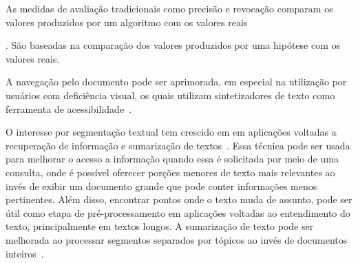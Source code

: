 As medidas de avaliação tradicionais como precisão e revocação comparam os valores produzidos por um algoritmo com os valores reais 



. São baseadas na comparação dos valores produzidos por uma hipótese com os valores reais. 












A navegação pelo documento pode ser aprimorada, em especial na utilização por usuários com deficiência visual, os quais utilizam  sintetizadores de texto como ferramenta de acessibilidade~\cite{Choi2000}. 








O interesse por segmentação textual tem crescido em em aplicações voltadas a recuperação de informação %
e sumarização de textos~\cite{Maziero2016}. %
Essa técnica pode ser usada para melhorar o acesso a informação quando essa é solicitada por meio de uma consulta, onde é possível oferecer porções menores de texto mais relevantes ao invés de exibir um documento grande que pode conter informações menos pertinentes.  Além disso, encontrar pontos onde o texto muda de assunto, pode ser útil como etapa de pré-processamento em aplicações voltadas ao entendimento do texto, principalmente em textos longos. 
A sumarização de texto pode ser melhorada ao processar segmentos separados por tópicos ao invés de documentos inteiros~\cite{Bhatia2016, Maziero2016, Bokaei2016}. 






